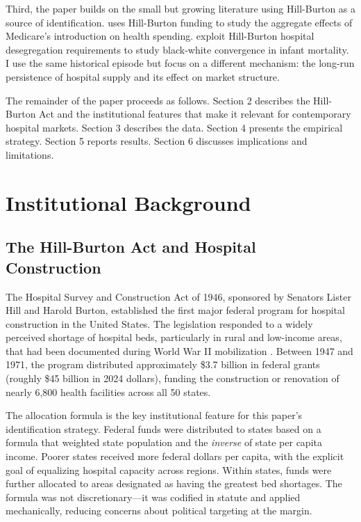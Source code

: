 \documentclass[12pt]{article}
\begin{document}
Third, the paper builds on the small but growing literature using Hill-Burton as a source of identification. \citet{finkelstein2007effect} uses Hill-Burton funding to study the aggregate effects of Medicare's introduction on health spending. \citet{almond2007civil} exploit Hill-Burton hospital desegregation requirements to study black-white convergence in infant mortality. I use the same historical episode but focus on a different mechanism: the long-run persistence of hospital supply and its effect on market structure.

The remainder of the paper proceeds as follows. Section 2 describes the Hill-Burton Act and the institutional features that make it relevant for contemporary hospital markets. Section 3 describes the data. Section 4 presents the empirical strategy. Section 5 reports results. Section 6 discusses implications and limitations.


\section{Institutional Background}

\subsection{The Hill-Burton Act and Hospital Construction}

The Hospital Survey and Construction Act of 1946, sponsored by Senators Lister Hill and Harold Burton, established the first major federal program for hospital construction in the United States. The legislation responded to a widely perceived shortage of hospital beds, particularly in rural and low-income areas, that had been documented during World War II mobilization \citep{hillburton1946}. Between 1947 and 1971, the program distributed approximately \$3.7 billion in federal grants (roughly \$45 billion in 2024 dollars), funding the construction or renovation of nearly 6,800 health facilities across all 50 states.

The allocation formula is the key institutional feature for this paper's identification strategy. Federal funds were distributed to states based on a formula that weighted state population and the \emph{inverse} of state per capita income. Poorer states received more federal dollars per capita, with the explicit goal of equalizing hospital capacity across regions. Within states, funds were further allocated to areas designated as having the greatest bed shortages. The formula was not discretionary---it was codified in statute and applied mechanically, reducing concerns about political targeting at the margin.
\end{document}
